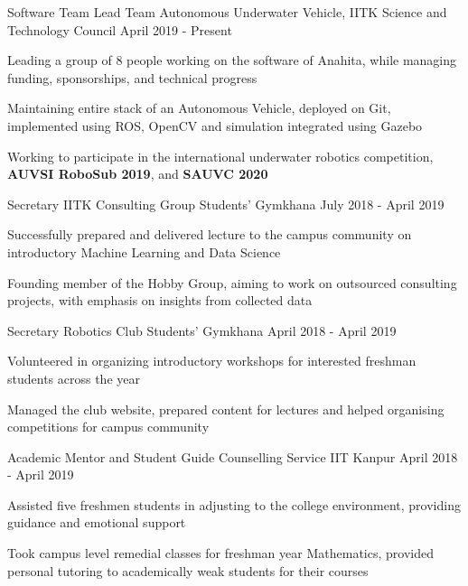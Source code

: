 \begin{cventries}
\cventry
    {Software Team Lead}
    {Team Autonomous Underwater Vehicle, IITK}
    {Science and Technology Council}
    {April 2019 - Present}
    {
      \begin{cvitems}
        \item {Leading a group of 8 people working on the software of Anahita, while managing funding, sponsorships, and technical progress}
        \item {Maintaining entire stack of an Autonomous Vehicle, deployed on Git, implemented using ROS, OpenCV and simulation integrated using Gazebo}
        \item {Working to participate in the international underwater robotics competition, \textbf{AUVSI RoboSub 2019}, and \textbf{SAUVC 2020}}
      \end{cvitems}
    }

  \cventry
    {Secretary}
    {IITK Consulting Group}
    {Students' Gymkhana} 
    {July 2018 - April 2019}
    {
      \begin{cvitems}
        \item {Successfully prepared and delivered lecture to the campus community on introductory Machine Learning and Data Science}
        \item {Founding member of the Hobby Group, aiming to work on outsourced consulting projects, with emphasis on insights from collected data}
      \end{cvitems}
    }

  \cventry
    {Secretary}
    {Robotics Club}
    {Students' Gymkhana} 
    {April 2018 - April 2019} 
    {
      \begin{cvitems}
        \item {Volunteered in organizing introductory workshops for interested freshman students across the year}
        \item{Managed the club website, prepared content for lectures and helped organising competitions for campus community}
        \end{cvitems}
    }

  \cventry
    {Academic Mentor and Student Guide}
    {Counselling Service}
    {IIT Kanpur} 
    {April 2018 - April 2019}
    {
      \begin{cvitems} %
        \item {Assisted five freshmen students in adjusting to the college environment, providing guidance and emotional support}
        \item{Took campus level remedial classes for freshman year Mathematics, provided personal tutoring to academically weak students for their courses}
      \end{cvitems}
    }

\end{cventries}
